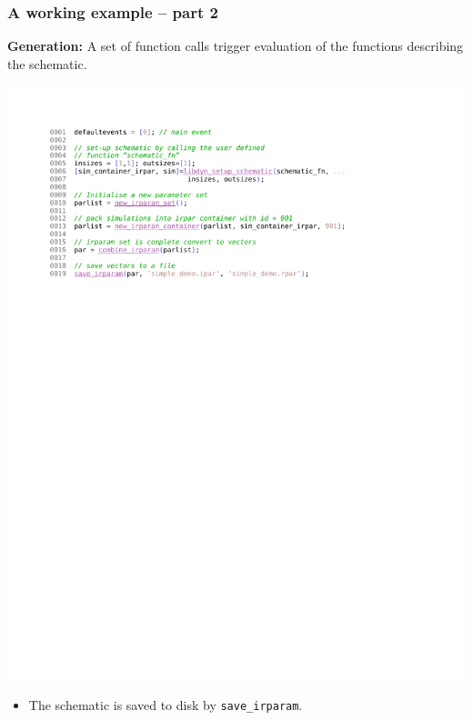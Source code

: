 \documentclass[serif,9pt,xcolor=dvipsnames]{beamer}
\begin{document}
\begin{frame}[fragile]
  \frametitle{A working example -- part 2}


  \textbf{Generation:} A set of function calls trigger evaluation of the functions describing the schematic.


\centering \includegraphics[trim=3cm 19cm 4cm 1.4cm, clip, width=0.85\linewidth]{figures/schematic_fn_load.pdf} 

\begin{itemize}
 \item The schematic is saved to disk by \texttt{save\_irparam}.
\end{itemize}


% 
% 
% 
% 
% 

\end{frame}
\end{document}
